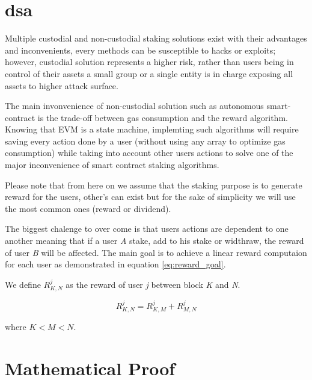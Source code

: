 \documentclass[a4paper]{article}
\begin{document}
\setlength{\parindent}{2ex}
\setlength{\parskip}{0.5em}
\section{\acrfull{dsa}}
\noindent
Multiple custodial and non-custodial staking solutions exist with their advantages and inconvenients, every methods can be susceptible to hacks or exploits; however, custodial solution represents a higher risk, rather than users being in control of their assets a small group or a single entity is in charge exposing all assets to higher attack surface.\par
\noindent
The main invonvenience of non-custodial solution such as autonomous smart-contract is the trade-off between gas consumption and the reward algorithm. Knowing that EVM is a state machine, implemting such algorithms will require saving every action done by a user (without using any array to optimize gas consumption) while taking into account other users actions to solve one of the major inconvenience of smart contract staking algorithms.\par
\noindent
Please note that from here on we assume that the staking purpose is to generate reward for the users, other's can exist but for the sake of simplicity we will use the most common ones (reward or dividend).\par
\noindent
The biggest chalenge to over come is that users actions are dependent to one another meaning that if a user \textit{A} stake, add to his stake or widthraw, the reward of user \textit{B} will be affected. The main goal is to achieve a linear reward computaion for each user as demonstrated in equation \ref{eq:reward_goal}.\par
\begin{flushleft}
We define $R_{K,N}^{j}$ as the reward of user \textit{j} between block \textit{K} and \textit{N}.
\end{flushleft}
\begin{equation} \label{eq:reward_goal}
R_{K,N}^{j}= R_{K,M}^{j}+R_{M,N}^{j}
\end{equation}
\begin{flushleft}
where $K < M < N$.
\end{flushleft}
\section{Mathematical Proof}
\end{document}
